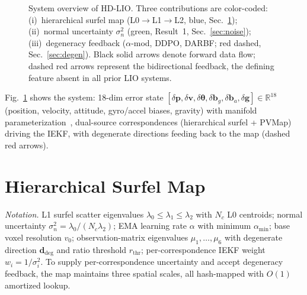 \documentclass[conference]{IEEEtran}
\newcommand{\bvec}[1]{\mathbf{#1}}
\begin{document}
\begin{figure}[t]
{%
  }
  \caption{System overview of HD-LIO. Three contributions are
  color-coded:
  \textcolor{blue!70!black}{(i)~hierarchical surfel map}
  (L0$\to$L1$\to$L2, blue, Sec.~\ref{sec:map});
  \textcolor{green!50!black}{(ii)~normal uncertainty $\sigma^2_n$}
  (green, Result~1, Sec.~\ref{sec:noise});
  \textcolor{red!70!black}{(iii)~degeneracy feedback}
  ($\alpha$-mod, DDPO, DARBF; red dashed, Sec.~\ref{sec:degen}).
  Black solid arrows denote forward data flow; dashed red arrows
  represent the bidirectional feedback, the defining feature absent
  in all prior LIO systems.}
  \label{fig:system}
\end{figure}

Fig.~\ref{fig:system} shows the system: 18-dim error state
$[\delta\bvec{p},\delta\bvec{v},\delta\boldsymbol{\theta},
\delta\bvec{b}_g,\delta\bvec{b}_a,\delta\bvec{g}]\!\in\!\mathbb{R}^{18}$
(position, velocity, attitude, gyro/accel biases, gravity) with
manifold parameterization~\cite{xu2021fastlio}, dual-source
correspondences (hierarchical surfel + PVMap) driving the IEKF, with
degenerate directions feeding back to the map (dashed red arrows).

\section{Hierarchical Surfel Map}\label{sec:map}

\noindent\textit{Notation.} L1 surfel scatter eigenvalues
$\lambda_0{\le}\lambda_1{\le}\lambda_2$ with $N_c$ L0 centroids;
normal uncertainty $\sigma^2_n{=}\lambda_0/(N_c\lambda_2)$; EMA
learning rate $\alpha$ with minimum $\alpha_\mathrm{min}$; base voxel
resolution $v_0$; observation-matrix eigenvalues
$\mu_1,\ldots,\mu_6$ with degenerate direction $\bvec{d}_\mathrm{deg}$
and ratio threshold $r_\mathrm{thr}$; per-correspondence IEKF weight
$w_i{=}1/\sigma^2_i$. To supply per-correspondence uncertainty and
accept degeneracy feedback, the map maintains three spatial scales,
all hash-mapped with $O(1)$ amortized lookup.
\end{document}
